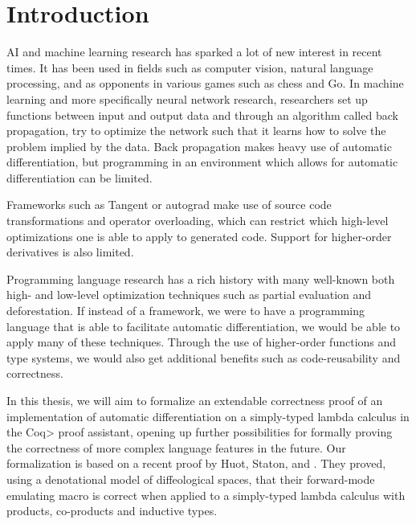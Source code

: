 \section{Introduction}
AI and machine learning research has sparked a lot of new interest in recent times. It has been used in fields such as computer vision, natural language processing, and as opponents in various games such as chess and Go.
In machine learning and more specifically neural network research, researchers set up functions between input and output data and through an algorithm called back propagation, try to optimize the network such that it learns how to solve the problem implied by the data.
Back propagation makes heavy use of automatic differentiation, but programming in an environment which allows for automatic differentiation can be limited.

Frameworks such as Tangent or autograd make use of source code transformations and operator overloading, which can restrict which high-level optimizations one is able to apply to generated code. Support for higher-order derivatives is also limited.

Programming language research has a rich history with many well-known both high- and low-level optimization techniques such as partial evaluation and deforestation.
If instead of a framework, we were to have a programming language that is able to facilitate automatic differentiation, we would be able to apply many of these techniques. Through the use of higher-order functions and type systems, we would also get additional benefits such as code-reusability and correctness.

In this thesis, we will aim to formalize an extendable correctness proof of an implementation of automatic differentiation on a simply-typed lambda calculus in the \<Coq> proof assistant, opening up further possibilities for formally proving the correctness of more complex language features in the future.
Our formalization is based on a recent proof by Huot, Staton, and \Vakar{} \cite{huot2020correctness}.
They proved, using a denotational model of diffeological spaces, that their forward-mode emulating macro is correct when applied to a simply-typed lambda calculus with products, co-products and inductive types.

